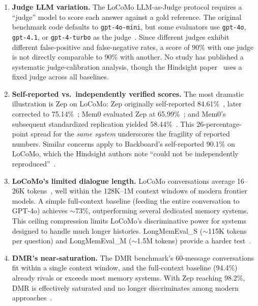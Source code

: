 \begin{enumerate}[leftmargin=*,nosep]

\item \textbf{Judge LLM variation.}
The LoCoMo LLM-as-Judge protocol requires a ``judge'' model to score each answer against a gold reference.
The original benchmark code defaults to \texttt{gpt-4o-mini}, but some evaluators use \texttt{gpt-4o}, \texttt{gpt-4.1}, or \texttt{gpt-4-turbo} as the judge~\cite{maharana2024locomo}.
Since different judges exhibit different false-positive and false-negative rates, a score of 90\% with one judge is not directly comparable to 90\% with another.
No study has published a systematic judge-calibration analysis, though the Hindsight paper~\cite{latimer2025hindsight} uses a fixed judge across all baselines.

\item \textbf{Self-reported vs.\ independently verified scores.}
The most dramatic illustration is Zep on LoCoMo:
Zep originally self-reported 84.61\%~\cite{zep2025},
later corrected to 75.14\%~\cite{zep2025};
Mem0 evaluated Zep at 65.99\%~\cite{choudhary2025mem0};
and Mem0's subsequent standardized replication yielded 58.44\%~\cite{mem0replication2025}.
This 26-percentage-point spread for the \emph{same system} underscores the fragility of reported numbers.
Similar concerns apply to Backboard's self-reported 90.1\% on LoCoMo, which the Hindsight authors note ``could not be independently reproduced''~\cite{latimer2025hindsight}.

\item \textbf{LoCoMo's limited dialogue length.}
LoCoMo conversations average 16--26K tokens~\cite{maharana2024locomo}, well within the 128K--1M context windows of modern frontier models.
A simple full-context baseline (feeding the entire conversation to GPT-4o) achieves ${\sim}$73\%, outperforming several dedicated memory systems.
This ceiling compression limits LoCoMo's discriminative power for systems designed to handle much longer histories.
LongMemEval\_S (${\sim}$115K tokens per question) and LongMemEval\_M (${\sim}$1.5M tokens) provide a harder test~\cite{wu2025longmemeval}.

\item \textbf{DMR's near-saturation.}
The DMR benchmark's 60-message conversations fit within a single context window, and the full-context baseline (94.4\%) already rivals or exceeds most memory systems.
With Zep reaching 98.2\%, DMR is effectively saturated and no longer discriminates among modern approaches~\cite{dempsey2025graphiti}.

\end{enumerate}

